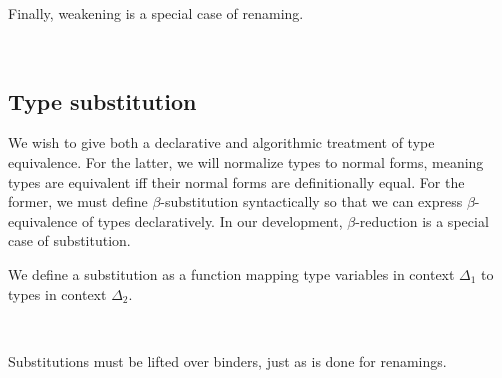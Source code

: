 \documentclass[authoryear, acmsmall, screen, review, nonacm]{acmart}
\begin{document}
Finally, weakening is a special case of renaming.

\begin{code}%
\>[0]\AgdaSpace{}%
\AgdaSymbol{:}\AgdaSpace{}%
\AgdaSpace{}%
\AgdaSpace{}%
\AgdaSpace{}%
\AgdaSpace{}%
\AgdaSpace{}%
\AgdaSymbol{(}\AgdaSpace{}%
\AgdaOperator{\AgdaInductiveConstructor{,,}}\AgdaSpace{}%
\AgdaSymbol{)}\AgdaSpace{}%
\<%
\\
\>[0]\AgdaSpace{}%
\AgdaSymbol{=}\AgdaSpace{}%
\AgdaSpace{}%
\<%
\end{code}

\subsection{Type substitution}

We wish to give both a declarative and algorithmic treatment of type equivalence. For the latter, we will normalize types to normal forms, meaning types are equivalent iff their normal forms are definitionally equal. For the former, we must define $\beta$-substitution syntactically so that we can express $\beta$-equivalence of types declaratively. In our development, $\beta$-reduction is a special case of substitution.

We define a substitution as a function mapping type variables in context $\Delta_1$ to types in context $\Delta_2$.

\begin{code}%
\>[0]\AgdaSpace{}%
\AgdaSymbol{:}\AgdaSpace{}%
\AgdaSpace{}%
\AgdaSpace{}%
\AgdaSpace{}%
\AgdaSpace{}%
\<%
\\
\>[0]\AgdaSpace{}%
\AgdaSpace{}%
\AgdaSpace{}%
\AgdaSymbol{=}\AgdaSpace{}%
\AgdaSpace{}%
\AgdaSymbol{\{}\AgdaSymbol{\}}\AgdaSpace{}%
\AgdaSpace{}%
\AgdaSpace{}%
\AgdaSpace{}%
\AgdaSpace{}%
\AgdaSpace{}%
\AgdaSpace{}%
\AgdaSpace{}%
\<%
\end{code}

Substitutions must be lifted over binders, just as is done for renamings. 
\end{document}
